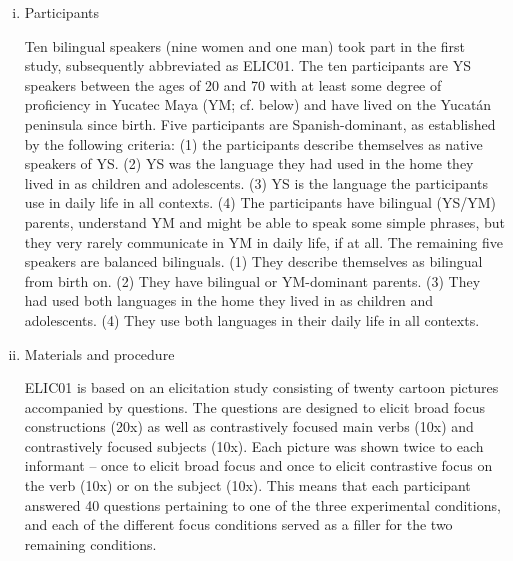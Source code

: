 \documentclass[output=paper]{langsci/langscibook}
\begin{document}
\begin{enumerate}[(i)]
\item{Participants}

Ten bilingual speakers (nine women and one man) took part in the first study, subsequently abbreviated as ELIC01. The ten participants are YS speakers between the ages of 20 and 70 with at least some degree of proficiency in Yucatec Maya (YM; cf. below) and have lived on the Yucatán peninsula since birth. Five participants are Spanish-dominant, as established by the following criteria: (1) the participants describe themselves as native speakers of YS. (2) YS was the language they had used in the home they lived in as children and adolescents. (3) YS is the language the participants use in daily life in all contexts. (4) The participants have bilingual (YS/YM) parents, understand YM and might be able to speak some simple phrases, but they very rarely communicate in YM in daily life, if at all. The remaining five speakers are balanced bilinguals. (1) They describe themselves as bilingual from birth on. (2) They have bilingual or YM-dominant parents. (3) They had used both languages in the home they lived in as children and adolescents. (4) They use both languages in their daily life in all contexts. 

\item{Materials and procedure}

ELIC01 is based on an elicitation study consisting of twenty cartoon pictures accompanied by questions. The questions are designed to elicit broad focus constructions (20x) as well as contrastively focused main verbs (10x) and contrastively focused subjects (10x). Each picture was shown twice to each informant – once to elicit broad focus and once to elicit contrastive focus on the verb (10x) or on the subject (10x). This means that each participant answered 40 questions pertaining to one of the three experimental conditions, and each of the different focus conditions served as a filler for the two remaining conditions.


\end{enumerate}
\end{document}
